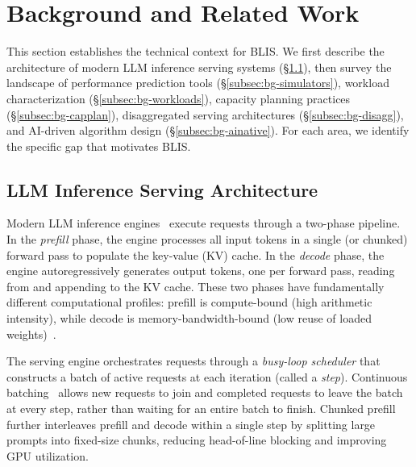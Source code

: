 \documentclass[11pt]{article}
\theoremstyle{plain} %
\theoremstyle{definition} %
\theoremstyle{remark} %
\numberwithin{equation}{section}
\begin{document}


\section{Background and Related Work}
\label{sec:background}

This section establishes the technical context for BLIS.
We first describe the architecture of modern LLM inference serving systems (\S\ref{subsec:bg-serving}), then survey the landscape of performance prediction tools (\S\ref{subsec:bg-simulators}), workload characterization (\S\ref{subsec:bg-workloads}), capacity planning practices (\S\ref{subsec:bg-capplan}), disaggregated serving architectures (\S\ref{subsec:bg-disagg}), and AI-driven algorithm design (\S\ref{subsec:bg-ainative}).
For each area, we identify the specific gap that motivates BLIS.

\subsection{LLM Inference Serving Architecture}
\label{subsec:bg-serving}

Modern LLM inference engines~\cite{kwon2023vllm, yu2022orca} execute requests through a two-phase pipeline.
In the \emph{prefill} phase, the engine processes all input tokens in a single (or chunked) forward pass to populate the key-value (KV) cache.
In the \emph{decode} phase, the engine autoregressively generates output tokens, one per forward pass, reading from and appending to the KV cache.
These two phases have fundamentally different computational profiles: prefill is compute-bound (high arithmetic intensity), while decode is memory-bandwidth-bound (low reuse of loaded weights)~\cite{yuan2024llminference, williams2009roofline}.

The serving engine orchestrates requests through a \emph{busy-loop scheduler} that constructs a batch of active requests at each iteration (called a \emph{step}).
Continuous batching~\cite{yu2022orca} allows new requests to join and completed requests to leave the batch at every step, rather than waiting for an entire batch to finish.
Chunked prefill~\cite{agrawal2023sarathi, agrawal2024sarathiserve} further interleaves prefill and decode within a single step by splitting large prompts into fixed-size chunks, reducing head-of-line blocking and improving GPU utilization.
\end{document}
